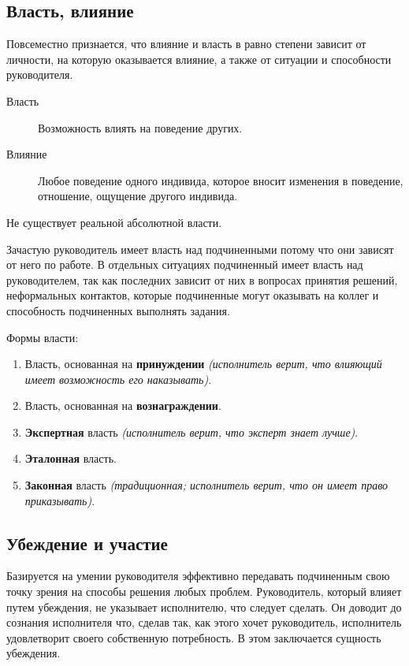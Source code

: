 \documentclass[a4paper,12pt,oneside,final]{extarticle}
\numberwithin{equation}{section}
\begin{document}
\subsection{Власть, влияние}
Повсеместно признается, что влияние и власть в равно степени зависит от личности, на которую оказывается влияние, а также от ситуации и способности руководителя.
\begin{description}
\item[Власть] Возможность влиять на поведение других.
\item[Влияние] Любое поведение одного индивида, которое вносит изменения в поведение, отношение, ощущение другого индивида.
\end{description}

Не существует реальной абсолютной власти.

Зачастую руководитель имеет власть над подчиненными потому что они зависят от него по работе. 
В отдельных ситуациях подчиненный имеет власть над руководителем, так как последних зависит от них в вопросах принятия решений, неформальных контактов, которые подчиненные могут оказывать на коллег и способность подчиненных выполнять задания. 

Формы власти:
\begin{enumerate}
	\item Власть, основанная на \textbf{принуждении} \textit{(исполнитель верит, что влияющий имеет возможность его наказывать)}.
	\item Власть, основанная на \textbf{вознаграждении}.
	\item \textbf{Экспертная} власть \textit{(исполнитель верит, что эксперт знает лучше)}.
	\item \textbf{Эталонная} власть.
	\item \textbf{Законная} власть \textit{(традиционная; исполнитель верит, что он имеет право приказывать)}.
\end{enumerate}

\subsection{Убеждение и участие}
Базируется на умении руководителя эффективно передавать подчиненным свою точку зрения на способы решения любых проблем. 
Руководитель, который влияет путем убеждения, не указывает исполнителю, что следует сделать. 
Он доводит до сознания исполнителя что, сделав так, как этого хочет руководитель, исполнитель удовлетворит своего собственную потребность. 
В этом заключается сущность убеждения.
\end{document}
